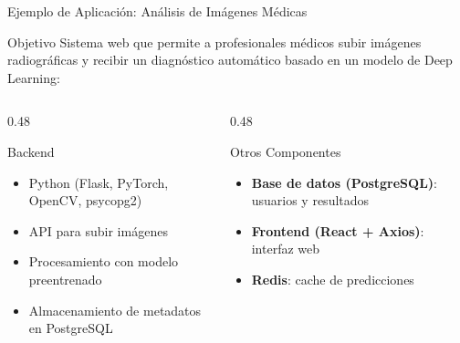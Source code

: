 \begin{frame}{Ejemplo de Aplicación: Análisis de Imágenes Médicas}
    \begin{block}{Objetivo}
        Sistema web que permite a profesionales médicos subir imágenes radiográficas
        y recibir un diagnóstico automático basado en un modelo de Deep Learning:
    \end{block}

    \begin{columns}
        \begin{column}{0.48\textwidth}
            \begin{block}{Backend}
                \begin{itemize}
                    \item Python (Flask, PyTorch, OpenCV, psycopg2)
                    \item API para subir imágenes
                    \item Procesamiento con modelo preentrenado
                    \item Almacenamiento de metadatos en PostgreSQL
                \end{itemize}
            \end{block}
        \end{column}

        \begin{column}{0.48\textwidth}
            \begin{block}{Otros Componentes}
                \begin{itemize}
                    \item \textbf{Base de datos (PostgreSQL)}: usuarios y resultados
                    \item \textbf{Frontend (React + Axios)}: interfaz web
                    \item \textbf{Redis}: cache de predicciones
                \end{itemize}
            \end{block}
        \end{column}
    \end{columns}
\end{frame}

